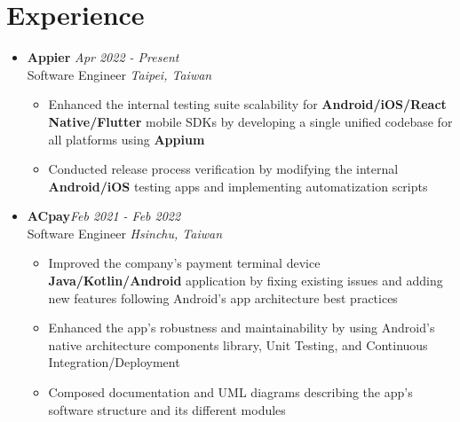 \section{\sectionheading Experience}

\begin{itemize}[leftmargin=0pt, label={}]%

\item{
{\sectionheading\large{\textbf{Appier}}} \hfill {\sectionheading\small{\textit{Apr 2022 - Present}}}\\
{\sectionheading\small{Software Engineer}}\hfill
{\sectionheading\small{\textit{Taipei, Taiwan}}}

    \vspace{-6pt}
    \begin{itemize}[label=\textbullet, leftmargin=*, noitemsep]
        \item{Enhanced the internal testing suite scalability for \textbf{Android/iOS/React Native/Flutter} mobile SDKs by developing a single unified codebase for all platforms using \textbf{Appium}}
        \item{Conducted release process verification by modifying the internal \textbf{Android/iOS} testing apps and implementing automatization scripts}
    \end{itemize}
}

\item{
{\sectionheading\large{\textbf{ACpay}}}\hfill {\sectionheading\small{\textit{Feb 2021 - Feb 2022}}}\\
{\sectionheading\small{Software Engineer}}\hfill
{\sectionheading\small{\textit{Hsinchu, Taiwan}}}

    \vspace{-6pt}
    \begin{itemize}[label=\textbullet, leftmargin=*, noitemsep]
        \item{Improved the company's payment terminal device \textbf{Java/Kotlin/Android} application by fixing existing issues and adding new features following Android's app architecture best practices}
        \item{Enhanced the app's robustness and maintainability by using Android's native architecture components library, Unit Testing, and Continuous Integration/Deployment}
        \item{Composed documentation and UML diagrams describing the app's software structure and its different modules}
    \end{itemize}
}


\end{itemize}
